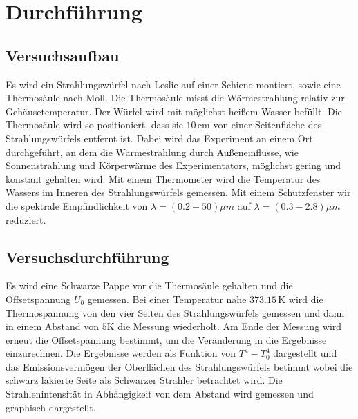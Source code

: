 \section{Durchführung}
\label{sec:Durchführung}
\subsection{Versuchsaufbau}
Es wird ein Strahlungswürfel nach Leslie auf einer Schiene montiert, sowie eine
Thermosäule nach Moll. Die Thermosäule misst die Wärmestrahlung relativ zur
Gehäusetemperatur. Der Würfel wird mit möglichst heißem Wasser befüllt. Die
Thermosäule wird so positioniert, dass sie $10\,\si{\centi\meter}$ von einer
Seitenfläche des Strahlungswürfels entfernt ist. Dabei wird das Experiment an
einem Ort durchgeführt, an dem die Wärmestrahlung durch Außeneinflüsse, wie
Sonnenstrahlung und Körperwärme des Experimentators, möglichst gering und konstant
gehalten wird. Mit einem Thermometer wird die Temperatur des Wassers im Inneren
des Strahlungswürfels gemessen. Mit einem Schutzfenster wir die spektrale
Empfindlichkeit von $\lambda=(0.2-50)\mu m$ auf $\lambda=(0.3-2.8)\mu m$ reduziert.

\subsection{Versuchsdurchführung}
Es wird eine Schwarze Pappe vor die Thermosäule gehalten und die Offsetspannung
$U_0$ gemessen.
Bei einer Temperatur nahe $373.15\,\si{\kelvin}$ wird die Thermospannung von den vier
Seiten des Strahlungswürfels gemessen und dann in einem Abstand von $5\si{\kelvin}$ die
Messung wiederholt. Am Ende der Messung wird erneut die Offsetspannung bestimmt,
um die Veränderung in die Ergebnisse einzurechnen. Die Ergebnisse werden als
Funktion von $T^4-T_0^4$ dargestellt und das Emissionsvermögen der Oberflächen
des Strahlungswürfels betimmt wobei die schwarz lakierte Seite als
Schwarzer Strahler betrachtet wird.
Die Strahlenintensität in Abhängigkeit von dem Abstand wird gemessen und
graphisch dargestellt.
